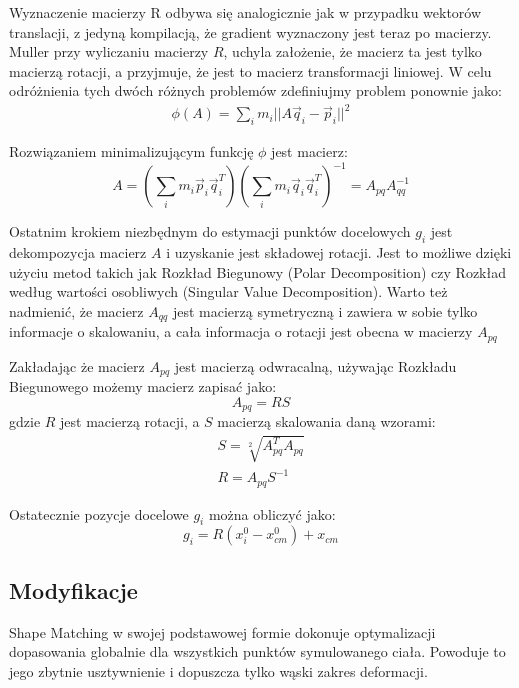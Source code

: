 Wyznaczenie macierzy R odbywa się analogicznie jak w przypadku wektorów
translacji, z jedyną kompilacją, że gradient wyznaczony jest teraz po macierzy.
Muller \cite{shape} przy wyliczaniu macierzy $R$, uchyla założenie, że macierz ta
jest tylko macierzą rotacji, a przyjmuje, że jest to macierz transformacji
liniowej. W celu odróżnienia tych dwóch różnych problemów zdefiniujmy problem
ponownie jako:
\begin{eqnarray}
\phi(A) = \sum_i m_i || A \vec{q}_i - \vec{p}_i||^2
\end{eqnarray}

Rozwiązaniem minimalizującym funkcję $\phi$ jest macierz:\cite{shape}
\begin{equation}
A = (\sum_i m_i \vec{p}_i \vec{q}^T_i)(\sum_i m_i \vec{q}_i \vec{q}^T_i)^{-1}
= A_{pq} A_{qq}^{-1}
\end{equation}

Ostatnim krokiem niezbędnym do estymacji punktów docelowych $g_i$ jest
dekompozycja macierz $A$ i uzyskanie jest składowej rotacji. Jest to możliwe dzięki
użyciu metod takich jak Rozkład Biegunowy (Polar Decomposition) czy Rozkład
według wartości osobliwych (Singular Value Decomposition). Warto też nadmienić,
	że macierz $A_{qq}$ jest macierzą symetryczną i zawiera w sobie tylko
	informacje o skalowaniu, a cała informacja o rotacji jest obecna w
	macierzy $A_{pq}$

Zakładając że macierz $A_{pq}$ jest macierzą odwracalną, używając Rozkładu
Biegunowego możemy macierz zapisać jako:
\begin{equation}
A_{pq} = RS
\end{equation}
gdzie $R$ jest macierzą rotacji, a $S$ macierzą skalowania daną wzorami:
\begin{eqnarray*}
S = \sqrt[2]{A^T_{pq} A_{pq}}\\
R = A_{pq} S^{-1}
\end{eqnarray*}

Ostatecznie pozycje docelowe $g_i$ można obliczyć jako:
\begin{equation}
g_i = R(x_i^0 - x^0_{cm}) + x_{cm}
\end{equation}

\subsection{Modyfikacje}
\label{sec:vol}
Shape Matching w swojej podstawowej formie dokonuje optymalizacji dopasowania
globalnie dla wszystkich punktów symulowanego ciała. Powoduje to jego zbytnie
usztywnienie i dopuszcza tylko wąski zakres deformacji.

